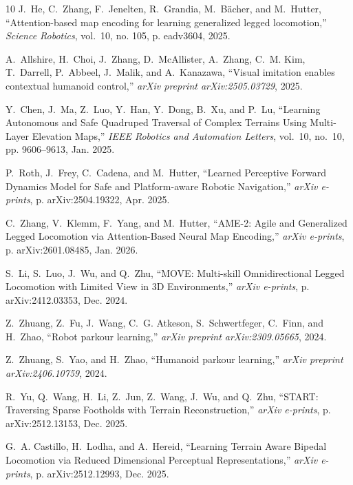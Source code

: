 \documentclass[letterpaper, 10 pt, conference]{ieeeconf/ieeeconf}
\begin{document}
\begin{thebibliography}{10}
J.~He, C.~Zhang, F.~Jenelten, R.~Grandia, M.~B{\"a}cher, and M.~Hutter,
  ``Attention-based map encoding for learning generalized legged locomotion,''
  \emph{Science Robotics}, vol.~10, no. 105, p. eadv3604, 2025.

A.~Allshire, H.~Choi, J.~Zhang, D.~McAllister, A.~Zhang, C.~M. Kim, T.~Darrell,
  P.~Abbeel, J.~Malik, and A.~Kanazawa, ``Visual imitation enables contextual
  humanoid control,'' \emph{arXiv preprint arXiv:2505.03729}, 2025.

Y.~{Chen}, J.~{Ma}, Z.~{Luo}, Y.~{Han}, Y.~{Dong}, B.~{Xu}, and P.~{Lu},
  ``{Learning Autonomous and Safe Quadruped Traversal of Complex Terrains Using
  Multi-Layer Elevation Maps},'' \emph{IEEE Robotics and Automation Letters},
  vol.~10, no.~10, pp. 9606--9613, Jan. 2025.

P.~{Roth}, J.~{Frey}, C.~{Cadena}, and M.~{Hutter}, ``{Learned Perceptive
  Forward Dynamics Model for Safe and Platform-aware Robotic Navigation},''
  \emph{arXiv e-prints}, p. arXiv:2504.19322, Apr. 2025.

C.~{Zhang}, V.~{Klemm}, F.~{Yang}, and M.~{Hutter}, ``{AME-2: Agile and
  Generalized Legged Locomotion via Attention-Based Neural Map Encoding},''
  \emph{arXiv e-prints}, p. arXiv:2601.08485, Jan. 2026.

S.~{Li}, S.~{Luo}, J.~{Wu}, and Q.~{Zhu}, ``{MOVE: Multi-skill Omnidirectional
  Legged Locomotion with Limited View in 3D Environments},'' \emph{arXiv
  e-prints}, p. arXiv:2412.03353, Dec. 2024.

Z.~Zhuang, Z.~Fu, J.~Wang, C.~G. Atkeson, S.~Schwertfeger, C.~Finn, and
  H.~Zhao, ``Robot parkour learning,'' \emph{arXiv preprint arXiv:2309.05665},
  2024.

Z.~Zhuang, S.~Yao, and H.~Zhao, ``Humanoid parkour learning,'' \emph{arXiv
  preprint arXiv:2406.10759}, 2024.

R.~{Yu}, Q.~{Wang}, H.~{Li}, Z.~{Jun}, Z.~{Wang}, J.~{Wu}, and Q.~{Zhu},
  ``{START: Traversing Sparse Footholds with Terrain Reconstruction},''
  \emph{arXiv e-prints}, p. arXiv:2512.13153, Dec. 2025.

G.~A. {Castillo}, H.~{Lodha}, and A.~{Hereid}, ``{Learning Terrain Aware
  Bipedal Locomotion via Reduced Dimensional Perceptual Representations},''
  \emph{arXiv e-prints}, p. arXiv:2512.12993, Dec. 2025.


\end{thebibliography}
\end{document}
